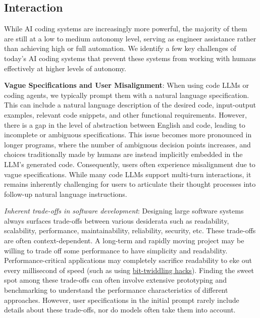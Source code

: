 \subsection{Interaction} \label{subsec:main-interaction}

While AI coding systems are increasingly more powerful, the majority of them are still at a low to medium autonomy level, serving as engineer assistance rather than achieving high or full automation. We identify a few key challenges of today's AI coding systems that prevent these systems from working with humans effectively at higher levels of autonomy.

\textbf{Vague Specifications and User Misalignment}: When using code LLMs or coding agents, we typically prompt them with a natural language specification. This can include a natural language description of the desired code, input-output examples, relevant code snippets, and other functional requirements. However, there is a gap in the level of abstraction between English and code, leading to incomplete or ambiguous specifications. This issue becomes more pronounced in longer programs, where the number of ambiguous decision points increases, and choices traditionally made by humans are instead implicitly embedded in the LLM’s generated code. Consequently, users often experience misalignment due to vague specifications. While many code LLMs support multi-turn interactions, it remains inherently challenging for users to articulate their thought processes into follow-up natural language instructions.

\textit{Inherent trade-offs in software development}: Designing large software systems always surfaces trade-offs between various desiderata such as readability, scalability, performance, maintainability, reliability, security, etc. These trade-offs are often context-dependent. A long-term and rapidly moving project may be willing to trade off some performance to have simplicity and readability. Performance-critical applications may completely sacrifice readability to eke out every millisecond of speed 
(such as using \href{https://graphics.stanford.edu/~seander/bithacks.html}{bit-twiddling hacks}).
Finding the sweet spot among these trade-offs can often involve extensive prototyping and benchmarking to understand the performance characteristics of different approaches. However, user specifications in the initial prompt rarely include details about these trade-offs, nor do models often take them into account.

